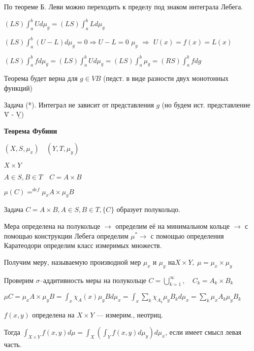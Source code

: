 По теореме Б. Леви можно переходить к пределу под знаком интеграла
Лебега.

$(LS) \int_a^b U d \mu_g = (LS) \int_a^b L d \mu_g $

$(LS) \int_a^b (U - L)d \mu_g = 0 \Rightarrow U - L = 0$ $\mu_g$
$\Rightarrow$ $U(x) = f(x) = L(x)$

$(LS) \int_a^b f d \mu_g = (LS)\int_a^b U d \mu_g = (LS) \int_a^b
\mu_g = (RS) \int_a^b f d g$

Теорема будет верна для $g \in VB$ (педст. в виде разности двух
монотонных функций)

Задача (*). Интеграл не зависит от представления $g$ (но будем
ист. представление \={V} - \b{V})

\begin{center} \textbf{Теорема Фубини} \end{center}

$(X, S, \mu_x)  \quad (Y, T, \mu_y)$

$X \times Y$

$A \in S, B \in T \quad C = A \times B$

$\mu(C) = ^{\!\!\!\!\!\! def} \mu_x A \times \mu_y B$

Задача $C = A \times B, A \in S, B \in T, \{C\}$ образует
полукольцо.

Мера определена на полукольце $\rightarrow$ определим её на
минимальном кольце $\rightarrow$ с помощью конструкции Лебега
определим $\mu^* \rightarrow$ с помощью определения Каратеодори
определим класс измеримых множеств.

Получим меру, называемую производной мер $\mu_x$ и $\mu_y$ на$X
\times Y, \; \mu = \mu_x \times \mu_y$


%
%
%
%
%
%
%
%
%
%
%

Проверим $\sigma$--аддитивность меры на полукольце $C =
\bigcup_{k=1}^\infty, \quad C_k = A_k \times B_k$

$\mu C = \mu_x A \times \mu_y B = \int_x \chi_A(x) \mu_y B d \mu_x
= \int_x \sum_k \chi_{A_k} \mu_y B_k d \mu_x = \sum_k \mu_x A_k
\mu_y B_k$

$f(x,y)$ определена на $X \times Y$ --- измерим., неотриц.

Тогда $\int_{X \times Y} f(x,y) d \mu = \int_X( \int_Y f(x,y) d
\mu_y) d \mu_x$, если имеет смысл левая часть.

